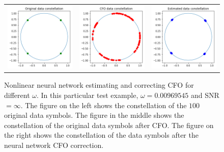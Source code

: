 \setlength{\tabcolsep}{0pt}
\begin{figure}
  \centering
  \caption{Nonlinear neural network estimating and correcting CFO for different $\omega$. In this particular test example, $\omega=0.00969545$ and SNR$=\infty$. The figure on the left shows the constellation of the $100$ original data symbols. The figure in the middle shows the constellation of the original data symbols after CFO. The figure on the right shows the constellation of the data symbols after the neural network CFO correction.}
  \begin{tabular}{ccc}
    \includegraphics[width=55mm]{figures/cfo/cfo_estimation_original_data.png}&
    \includegraphics[width=55mm]{figures/cfo/cfo_estimation_cfo_data.png}&
    \includegraphics[width=55mm]{figures/cfo/cfo_estimation_est_data.png}\\
  \end{tabular}
  \label{fig:cfo_demon_single_tap}
\end{figure}

